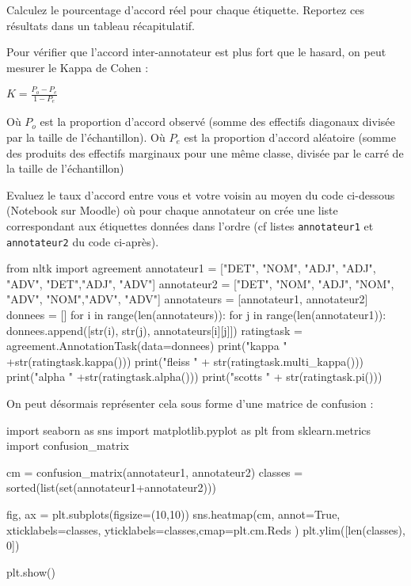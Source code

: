 Calculez le pourcentage d'accord réel pour chaque étiquette. Reportez ces résultats dans un tableau récapitulatif.

 Pour vérifier que l'accord inter-annotateur est plus fort que le hasard, on peut mesurer le Kappa de Cohen :

$K = \frac{P_o - P_e}{1-P_e}$

Où $P_o$ est la proportion d'accord observé (somme des effectifs diagonaux divisée par la taille de l'échantillon).
Où $P_e$ est la proportion d'accord aléatoire (somme des produits des effectifs marginaux pour une même classe, divisée par le carré de la taille de l'échantillon)

Evaluez le taux d'accord entre vous et votre voisin au moyen du code ci-dessous (Notebook sur Moodle) où pour chaque annotateur on crée une liste correspondant aux étiquettes données dans l'ordre (cf listes \texttt{annotateur1} et \texttt{annotateur2} du code ci-après).
\newpage
\begin{python}
from nltk import agreement
annotateur1 = ["DET", "NOM", "ADJ", "ADJ", "ADV", "DET","ADJ", "ADV"]
annotateur2 = ["DET", "NOM", "ADJ", "NOM", "ADV", "NOM","ADV", "ADV"]
annotateurs = [annotateur1, annotateur2]
donnees = []
for i in range(len(annotateurs)):
  for j in range(len(annotateur1)):
    donnees.append([str(i), str(j), annotateurs[i][j]])
ratingtask = agreement.AnnotationTask(data=donnees)
print("kappa " +str(ratingtask.kappa()))
print("fleiss " + str(ratingtask.multi_kappa()))
print("alpha " +str(ratingtask.alpha()))
print("scotts " + str(ratingtask.pi()))
\end{python}

On peut désormais représenter cela sous forme d'une matrice de confusion :

\begin{python}
import seaborn as sns
import matplotlib.pyplot as plt
from sklearn.metrics import confusion_matrix

cm = confusion_matrix(annotateur1, annotateur2)
classes = sorted(list(set(annotateur1+annotateur2)))

fig, ax = plt.subplots(figsize=(10,10))
sns.heatmap(cm, annot=True, xticklabels=classes, yticklabels=classes,cmap=plt.cm.Reds )
plt.ylim([len(classes), 0])

plt.show()
\end{python}
